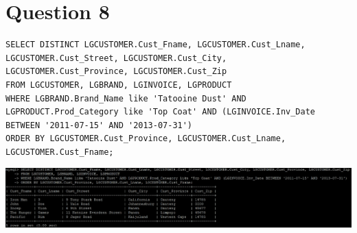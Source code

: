 \documentclass[a4paper,10pt]{article}
\begin{document}
\section {Question 8}
\lstset{
            language=SQL,
            breaklines=true
            }
        \begin{lstlisting}[frame=single]
        SELECT DISTINCT LGCUSTOMER.Cust_Fname, LGCUSTOMER.Cust_Lname, LGCUSTOMER.Cust_Street, LGCUSTOMER.Cust_City, LGCUSTOMER.Cust_Province, LGCUSTOMER.Cust_Zip
FROM LGCUSTOMER, LGBRAND, LGINVOICE, LGPRODUCT
WHERE LGBRAND.Brand_Name like 'Tatooine Dust' AND LGPRODUCT.Prod_Category like 'Top Coat' AND (LGINVOICE.Inv_Date BETWEEN '2011-07-15' AND '2013-07-31')
ORDER BY LGCUSTOMER.Cust_Province, LGCUSTOMER.Cust_Lname, LGCUSTOMER.Cust_Fname;

        \end{lstlisting}
\includegraphics{Queries/Question_8/Q8_screenshot.jpg}
\end{document}
